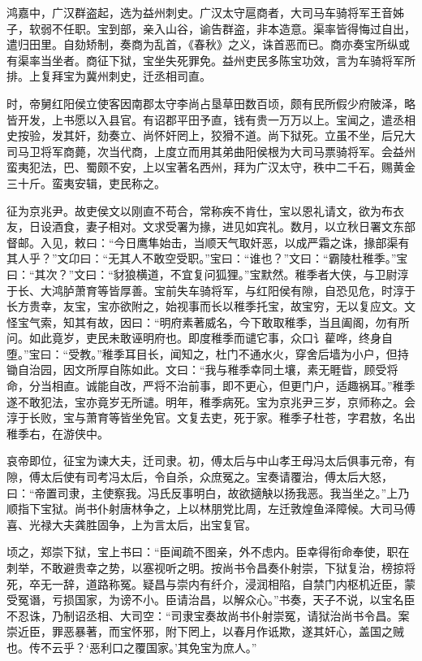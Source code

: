 \documentclass[12pt,UTF8]{ctexbook}
\begin{document}
鸿嘉中，广汉群盗起，选为益州刺史。广汉太守扈商者，大司马车骑将军王音姊子，软弱不任职。宝到部，亲入山谷，谕告群盗，非本造意。渠率皆得悔过自出，遣归田里。自劾矫制，奏商为乱首，《春秋》之义，诛首恶而已。商亦奏宝所纵或有渠率当坐者。商征下狱，宝坐失死罪免。益州吏民多陈宝功效，言为车骑将军所排。上复拜宝为冀州刺史，迁丞相司直。



时，帝舅红阳侯立使客因南郡太守李尚占垦草田数百顷，颇有民所假少府陂泽，略皆开发，上书愿以入县官。有诏郡平田予直，钱有贵一万万以上。宝闻之，遣丞相史按验，发其奸，劾奏立、尚怀奸罔上，狡猾不道。尚下狱死。立虽不坐，后兄大司马卫将军商薨，次当代商，上度立而用其弟曲阳侯根为大司马票骑将军。会益州蛮夷犯法，巴、蜀颇不安，上以宝著名西州，拜为广汉太守，秩中二千石，赐黄金三十斤。蛮夷安辑，吏民称之。



征为京兆尹。故吏侯文以刚直不苟合，常称疾不肯仕，宝以恩礼请文，欲为布衣友，日设酒食，妻子相对。文求受署为掾，进见如宾礼。数月，以立秋日署文东部督邮。入见，敕曰：“今日鹰隼始击，当顺天气取奸恶，以成严霜之诛，掾部渠有其人乎？”文卬曰：“无其人不敢空受职。”宝曰：“谁也？”文曰：“霸陵杜稚季。”宝曰：“其次？”文曰：“豺狼横道，不宜复问狐狸。”宝默然。稚季者大侠，与卫尉淳于长、大鸿胪萧育等皆厚善。宝前失车骑将军，与红阳侯有隙，自恐见危，时淳于长方贵幸，友宝，宝亦欲附之，始视事而长以稚季托宝，故宝穷，无以复应文。文怪宝气索，知其有故，因曰：“明府素著威名，今下敢取稚季，当且阖阁，勿有所问。如此竟岁，吏民未敢诬明府也。即度稚季而谴它事，众口讠雚哗，终身自堕。”宝曰：“受教。”稚季耳目长，闻知之，杜门不通水火，穿舍后墙为小户，但持锄自治园，因文所厚自陈如此。文曰：“我与稚季幸同土壤，素无睚眥，顾受将命，分当相直。诚能自改，严将不治前事，即不更心，但更门户，适趣祸耳。”稚季遂不敢犯法，宝亦竟岁无所谴。明年，稚季病死。宝为京兆尹三岁，京师称之。会淳于长败，宝与萧育等皆坐免官。文复去吏，死于家。稚季子杜苍，字君敖，名出稚季右，在游侠中。



哀帝即位，征宝为谏大夫，迁司隶。初，傅太后与中山孝王母冯太后俱事元帝，有隙，傅太后使有司考冯太后，令自杀，众庶冤之。宝奏请覆治，傅太后大怒，曰：“帝置司隶，主使察我。冯氏反事明白，故欲擿觖以扬我恶。我当坐之。”上乃顺指下宝狱。尚书仆射唐林争之，上以林朋党比周，左迁敦煌鱼泽障候。大司马傅喜、光禄大夫龚胜固争，上为言太后，出宝复官。



顷之，郑崇下狱，宝上书曰：“臣闻疏不图亲，外不虑内。臣幸得衔命奉使，职在刺举，不敢避贵幸之势，以塞视听之明。按尚书令昌奏仆射崇，下狱复治，榜掠将死，卒无一辞，道路称冤。疑昌与崇内有纤介，浸润相陷，自禁门内枢机近臣，蒙受冤谮，亏损国家，为谤不小。臣请治昌，以解众心。”书奏，天子不说，以宝名臣不忍诛，乃制诏丞相、大司空：“司隶宝奏故尚书仆射崇冤，请狱治尚书令昌。案崇近臣，罪恶暴著，而宝怀邪，附下罔上，以春月作诋欺，遂其奸心，盖国之贼也。传不云乎？‘恶利口之覆国家。’其免宝为庶人。”
\end{document}
